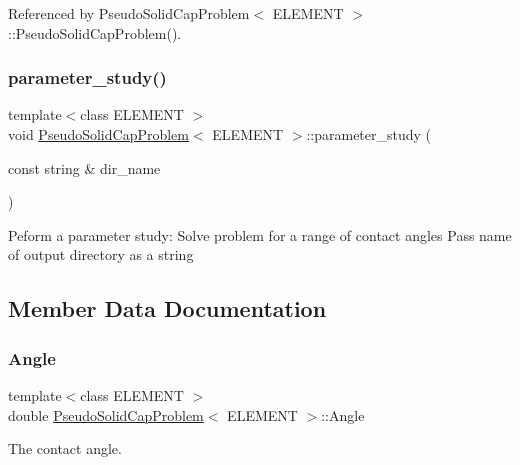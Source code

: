 Referenced by Pseudo\+Solid\+Cap\+Problem$<$ E\+L\+E\+M\+E\+N\+T $>$\+::\+Pseudo\+Solid\+Cap\+Problem().

\mbox{\label{classPseudoSolidCapProblem_ae86ecaf62fa0920f5d14bf82a7f83b0e}} 
\subsubsection{\texorpdfstring{parameter\+\_\+study()}{parameter\_study()}\hspace{0.1cm}{\footnotesize\ttfamily [2/2]}}
{\footnotesize\ttfamily template$<$class E\+L\+E\+M\+E\+NT $>$ \\
void \hyperlink{classPseudoSolidCapProblem}{Pseudo\+Solid\+Cap\+Problem}$<$ E\+L\+E\+M\+E\+NT $>$\+::parameter\+\_\+study (\begin{DoxyParamCaption}\item[{const string \&}]{dir\+\_\+name }\end{DoxyParamCaption})}

Peform a parameter study\+: Solve problem for a range of contact angles Pass name of output directory as a string 

\subsection{Member Data Documentation}
\mbox{\label{classPseudoSolidCapProblem_a51dfbd14a2cca78dc0efe6740337a22b}} 
\subsubsection{\texorpdfstring{Angle}{Angle}}
{\footnotesize\ttfamily template$<$class E\+L\+E\+M\+E\+NT $>$ \\
double \hyperlink{classPseudoSolidCapProblem}{Pseudo\+Solid\+Cap\+Problem}$<$ E\+L\+E\+M\+E\+NT $>$\+::Angle\hspace{0.3cm}{\ttfamily [private]}}



The contact angle. 



